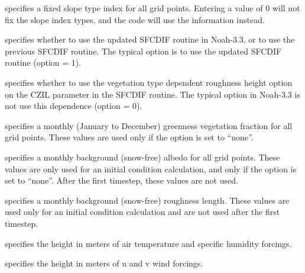  specifies a fixed slope
 type index for all grid points.  Entering a value of 0 will
 not fix the slope index types, and the code will use the
  information instead.

  specifies whether to use the updated
 SFCDIF routine in Noah-3.3, or to use the previous SFCDIF routine.
 The typical option is to use the updated SFCDIF routine (option = 1).

  specifies whether
 to use the vegetation type dependent roughness height option
 on the CZIL parameter in the SFCDIF routine.  The typical option
 in Noah-3.3 is not use this dependence (option = 0).

  specifies a monthly (January
 to December) greenness vegetation fraction for all grid points.
 These values are used only if the 
 option is set to ``none''.

  specifies a monthly background
 (snow-free) albedo for all grid points.  These values are only
 used for an initial condition calculation, and only if the
  option is set to ``none''.  After
 the first timestep, these values are not used.

  specifies a monthly
 background (snow-free) roughness length.  These values are used
 only for an initial condition calculation and are not used after
 the first timestep.

  specifies the
 height in meters of air temperature and specific humidity forcings.

  specifies the
 height in meters of u and v wind forcings.
 

